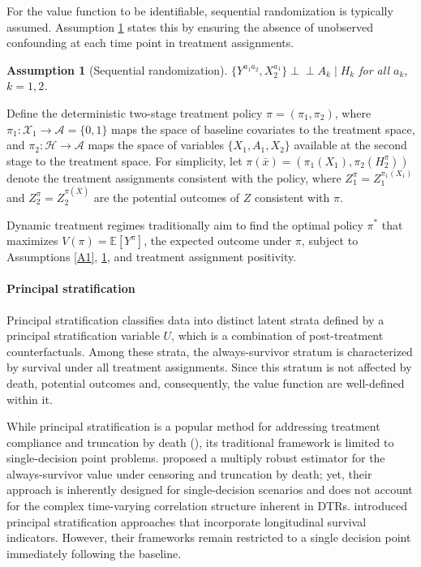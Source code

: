\documentclass{article}
\newcommand{\indep}{{\perp\!\!\!\!\perp}}
\newtheorem{assumption}{Assumption}
\begin{document}
For the value function to be identifiable, sequential randomization is typically assumed. Assumption \ref{AA} states this by ensuring the absence of unobserved confounding at each time point in treatment assignments.
	
	\begin{assumption}[Sequential randomization] \label{AA}
			$\{Y^{a_1a_2}, X_2^{a_1}\} \indep A_k \mid H_{k}$ for all $a_k$, $k=1,2$.
	\end{assumption}

Define the deterministic two-stage treatment policy $\pi = (\pi_1, \pi_2)$, where $\pi_1: \mathcal{X}_1 \rightarrow \mathcal{A} = \{0, 1\}$ maps the space of baseline covariates to the treatment space, and $\pi_2: \mathcal{H} \rightarrow \mathcal{A}$ maps the space of variables $\{X_1, A_1, X_2\}$ available at the second stage to the treatment space. For simplicity, let $\pi(\bar{x}) =  (\pi_1(X_1), \pi_2(H_2^{\pi}))$ denote the treatment assignments consistent with the policy, where $Z_1^\pi = Z_1^{\pi_1(X_1)}$ and $Z_2^\pi = Z_2^{\pi(\bar{X})}$ are the potential outcomes of $Z$ consistent with $\pi$.
	
Dynamic treatment regimes traditionally aim to find the optimal policy $\pi^*$ that maximizes $V(\pi) = \mathbb{E}[Y^\pi]$, the expected outcome under $\pi$, subject to Assumptions \ref{A1}, \ref{AA}, and treatment assignment positivity.


\paragraph{Principal stratification}	
Principal stratification classifies data into distinct latent strata defined by a principal stratification variable $U$, which is a combination of post-treatment counterfactuals. 
Among these strata, the always-survivor stratum is characterized by survival under all treatment assignments. Since this stratum is not affected by death, potential outcomes and, consequently, the value function are well-defined within it.

While principal stratification is a popular method for addressing treatment compliance and truncation by death (\citealp{ps3}), its traditional framework is limited to single-decision point problems. 
\cite{chu23c} proposed a multiply robust estimator for the always-survivor value under censoring and truncation by death; yet, their approach is inherently designed for single-decision scenarios and does not account for the complex time-varying correlation structure inherent in DTRs.
\cite{GROSSI2025} introduced principal stratification approaches that incorporate longitudinal survival indicators. However, their frameworks remain restricted to a single decision point immediately following the baseline.  
	
\end{document}
